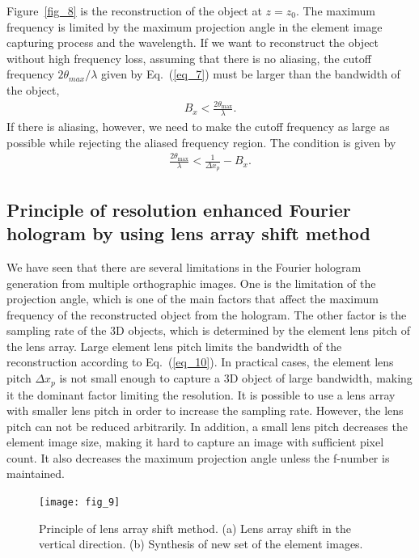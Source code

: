 \documentclass[10pt,letterpaper]{article}
\begin{document}
Figure~\ref{fig_8} is the reconstruction of the object at $z=z_0$. The maximum frequency is limited by the maximum projection angle in the element image capturing process and the wavelength. If we want to reconstruct the object without high frequency loss, assuming that there is no aliasing, the cutoff frequency $2\theta_{max}/\lambda$ given by Eq.~(\ref{eq_7}) must be larger than the bandwidth of the object,
\begin{equation}
\begin{aligned}
{B_x} < \frac{{2{\theta _{\max }}}}{\lambda }.
\end{aligned}
\label{eq_9}
\end{equation}
If there is aliasing, however, we need to make the cutoff frequency as large as possible while rejecting the aliased frequency region. The condition is given by
\begin{equation}
\begin{aligned}
\frac{2\theta _{\max}}{\lambda } < \frac{1}{\Delta x_p} - B_x.
\end{aligned}
\label{eq_10}
\end{equation}

\subsection{Principle of resolution enhanced Fourier hologram by using lens array shift method}
We have seen that there are several limitations in the Fourier hologram generation from multiple orthographic images. One is the limitation of the projection angle, which is one of the main factors that affect the maximum frequency of the reconstructed object from the hologram. The other factor is the sampling rate of the 3D objects, which is determined by the element lens pitch of the lens array. Large element lens pitch limits the bandwidth of the reconstruction according to Eq.~(\ref{eq_10}). In practical cases, the element lens pitch $\Delta x_p$ is not small enough to capture a 3D object of large bandwidth, making it the dominant factor limiting the resolution. It is possible to use a lens array with smaller lens pitch in order to increase the sampling rate. However, the lens pitch can not be reduced arbitrarily. In addition, a small lens pitch decreases the element image size, making it hard to capture an image with sufficient pixel count. It also decreases the maximum projection angle unless the f-number is maintained.
\begin{figure}[htbp]
\centering\texttt{[image: fig\_9]}
\caption{Principle of lens array shift method. (a) Lens array shift in the vertical direction. (b) Synthesis of new set of the element images.}
\label{fig_9}
\end{figure}
\end{document}
